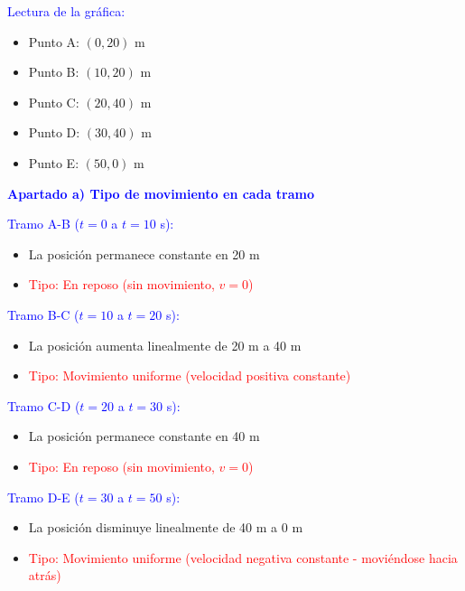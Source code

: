 \begin{exercise}
\begin{solu}
        \vspace{0.3cm}

        \textcolor{blue}{Lectura de la gráfica:}
        \begin{itemize}
            \item Punto A: $(0, 20)$ m
            \item Punto B: $(10, 20)$ m
            \item Punto C: $(20, 40)$ m
            \item Punto D: $(30, 40)$ m
            \item Punto E: $(50, 0)$ m
        \end{itemize}

        \textbf{\textcolor{blue}{Apartado a) Tipo de movimiento en cada tramo}}

        \textcolor{blue}{Tramo A-B ($t = 0$ a $t = 10$ s):}
        \begin{itemize}
            \item La posición permanece constante en 20 m
            \item \textcolor{red}{Tipo: En reposo (sin movimiento, $v = 0$)}
        \end{itemize}

        \textcolor{blue}{Tramo B-C ($t = 10$ a $t = 20$ s):}
        \begin{itemize}
            \item La posición aumenta linealmente de 20 m a 40 m
            \item \textcolor{red}{Tipo: Movimiento uniforme (velocidad positiva constante)}
        \end{itemize}

        \textcolor{blue}{Tramo C-D ($t = 20$ a $t = 30$ s):}
        \begin{itemize}
            \item La posición permanece constante en 40 m
            \item \textcolor{red}{Tipo: En reposo (sin movimiento, $v = 0$)}
        \end{itemize}

        \textcolor{blue}{Tramo D-E ($t = 30$ a $t = 50$ s):}
        \begin{itemize}
            \item La posición disminuye linealmente de 40 m a 0 m
            \item \textcolor{red}{Tipo: Movimiento uniforme (velocidad negativa constante - moviéndose hacia atrás)}
        \end{itemize}


\end{solu}
\end{exercise}
